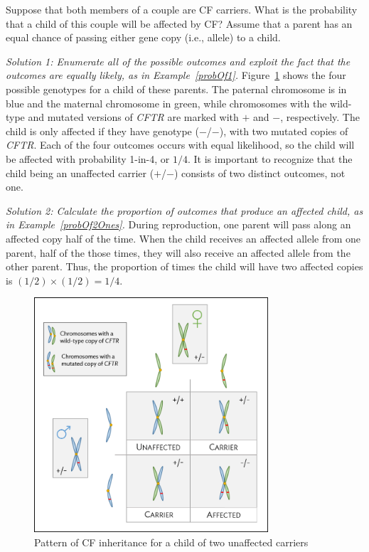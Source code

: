 \begin{examplewrap}
\begin{nexample}{Suppose that both members of a couple are CF carriers. What is the probability that a child of this couple will be affected by CF? Assume that a parent has an equal chance of passing either gene copy (i.e., allele) to a child.}\label{CFInheritanceExample}

\textit{Solution 1: Enumerate all of the possible outcomes and exploit the fact that the outcomes are equally likely, as in Example~\ref{probOf1}.}  Figure~\ref{fig:cfInheritance} shows the four possible genotypes for a child of these parents. The paternal chromosome is in blue and the maternal chromosome in green, while chromosomes with the wild-type and mutated versions of \textit{CFTR} are marked with $+$ and $-$, respectively. The child is only affected if they have genotype ($-$/$-$), with two mutated copies of \textit{CFTR}. Each of the four outcomes occurs with equal likelihood, so the child will be affected with probability 1-in-4, or $1/4$.  It is important to recognize that the child being an unaffected carrier ($+$/$-$) consists of two distinct outcomes, not one. 

\textit{Solution 2:  Calculate the proportion of outcomes that produce an affected child, as in Example~\ref{probOf2Ones}.}  During reproduction, one parent will pass along an affected copy half of the time.  When the child receives an affected allele from one parent, half of the those times, they will also receive an affected allele from the other parent. Thus, the proportion of times the child will have two affected copies is $(1/2) \times (1/2) = 1/4$.
\end{nexample}
\end{examplewrap}

\begin{figure}[h]
	\centering
	\includegraphics[width= 0.775\textwidth]{ch_probability_oi_biostat/figures/cfInheritance/cfInheritance.png}
	\caption{Pattern of CF inheritance for a child of two unaffected carriers}
	\label{fig:cfInheritance}
\end{figure}

